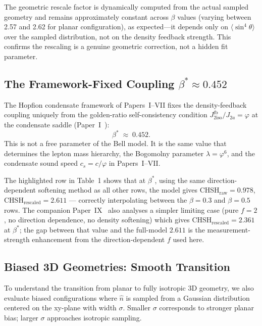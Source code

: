 \documentclass[11pt,a4paper]{article}
\theoremstyle{definition}
\theoremstyle{remark}
\begin{document}
The geometric rescale factor is dynamically computed from the actual sampled geometry and remains approximately constant across $\beta$ values (varying between 2.57 and 2.62 for planar configuration), as expected---it depends only on $\langle \sin^4\theta \rangle$ over the sampled distribution, not on the density feedback strength. This confirms the rescaling is a genuine geometric correction, not a hidden fit parameter.

\subsection{The Framework-Fixed Coupling $\beta^* \approx 0.452$}
\label{P8:sec:beta_star}

The Hopfion condensate framework of Papers~I--VII fixes the density-feedback
coupling uniquely from the golden-ratio self-consistency condition
$J_{2\mathrm{iso}}^{\mathrm{fb}}/J_{2a} = \varphi$ at the condensate saddle (Paper~I~\cite{Paper1}):
\begin{equation}
  \beta^* \;\approx\; 0.452.
  \label{P8:eq:beta_star}
\end{equation}
This is not a free parameter of the Bell model.
It is the same value that determines the lepton mass hierarchy, the Bogomolny
parameter $\lambda = \varphi^6$, and the condensate sound speed $c_s = c/\varphi$
in Papers~I--VII.

The highlighted row in Table~1 shows that at $\beta^*$, using the same
direction-dependent softening method as all other rows, the model gives
CHSH$_\mathrm{raw} = 0.978$, CHSH$_\mathrm{rescaled} = 2.611$ --- correctly
interpolating between the $\beta=0.3$ and $\beta=0.5$ rows.
The companion Paper~IX~\cite{Paper9} also analyses a simpler limiting case (pure
$f=2$, no direction dependence, no density softening) which gives
CHSH$_\mathrm{rescaled}=2.361$ at $\beta^*$; the gap between that value and
the full-model $2.611$ is the measurement-strength enhancement from the
direction-dependent $f$ used here.

\subsection{Biased 3D Geometries: Smooth Transition}

To understand the transition from planar to fully isotropic 3D geometry, we also evaluate biased configurations where $\hat{n}$ is sampled from a Gaussian distribution centered on the xy-plane with width $\sigma$. Smaller $\sigma$ corresponds to stronger planar bias; larger $\sigma$ approaches isotropic sampling.
\end{document}
